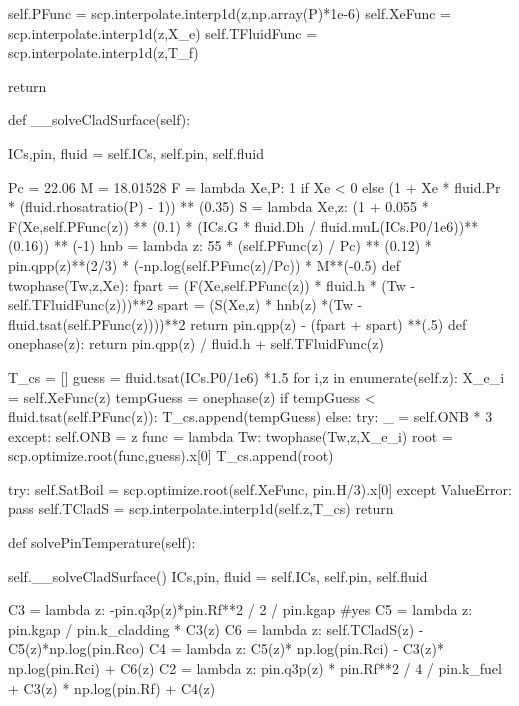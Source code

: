 \documentclass{article}
\begin{document}
\begin{python}
        
        self.PFunc = scp.interpolate.interp1d(z,np.array(P)*1e-6)
        self.XeFunc = scp.interpolate.interp1d(z,X_e)
        self.TFluidFunc = scp.interpolate.interp1d(z,T_f)
        
        return


    def __solveCladSurface(self):

        ICs,pin, fluid = self.ICs, self.pin, self.fluid

        Pc = 22.06
        M = 18.01528
        F = lambda Xe,P: 1 if Xe < 0 else (1 + Xe * fluid.Pr * (fluid.rhosatratio(P) - 1)) ** (0.35)
        S = lambda Xe,z: (1 + 0.055 * F(Xe,self.PFunc(z)) ** (0.1) * (ICs.G * fluid.Dh / fluid.muL(ICs.P0/1e6))**(0.16)) ** (-1)
        hnb = lambda z: 55 * (self.PFunc(z) / Pc) ** (0.12) * pin.qpp(z)**(2/3) * (-np.log(self.PFunc(z)/Pc)) * M**(-0.5)
        def twophase(Tw,z,Xe):
            fpart = (F(Xe,self.PFunc(z)) * fluid.h * (Tw - self.TFluidFunc(z)))**2
            spart = (S(Xe,z) * hnb(z) *(Tw - fluid.tsat(self.PFunc(z))))**2
            return pin.qpp(z) - (fpart + spart) **(.5)
        def onephase(z):
            return pin.qpp(z) / fluid.h + self.TFluidFunc(z)

        T_cs = []
        guess = fluid.tsat(ICs.P0/1e6) *1.5
        for i,z in enumerate(self.z):
            X_e_i = self.XeFunc(z)
            tempGuess = onephase(z)
            if tempGuess < fluid.tsat(self.PFunc(z)):
                T_cs.append(tempGuess)
            else:
                try:
                    _ = self.ONB * 3
                except:
                    self.ONB = z
                func = lambda Tw: twophase(Tw,z,X_e_i)
                root = scp.optimize.root(func,guess).x[0]
                T_cs.append(root)

        try:
            self.SatBoil = scp.optimize.root(self.XeFunc, pin.H/3).x[0]
        except ValueError:
            pass
        self.TCladS = scp.interpolate.interp1d(self.z,T_cs)
        return
            

    def solvePinTemperature(self):

        self.__solveCladSurface()
        ICs,pin, fluid = self.ICs, self.pin, self.fluid

        C3 = lambda z: -pin.q3p(z)*pin.Rf**2 / 2 / pin.kgap #yes
        C5 = lambda z: pin.kgap / pin.k_cladding * C3(z) 
        C6 = lambda z: self.TCladS(z) - C5(z)*np.log(pin.Rco)
        C4 = lambda z: C5(z)* np.log(pin.Rci) - C3(z)* np.log(pin.Rci) + C6(z)
        C2 = lambda z: pin.q3p(z) * pin.Rf**2 / 4 / pin.k_fuel + C3(z) * np.log(pin.Rf) + C4(z)


\end{python}
\end{document}

